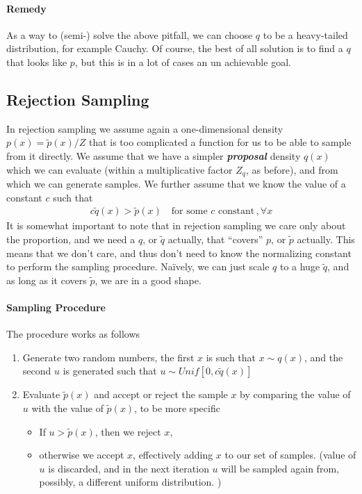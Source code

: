 \documentclass[11pt]{article}
\begin{document}
\paragraph{Remedy} As a way to (semi-) solve the above pitfall, we can choose $q$ to be a heavy-tailed distribution, for example Cauchy. Of course, the best of all solution is to find a $q$ that looks like $p$, but this is in a lot of cases an un achievable goal. 

\subsection{Rejection Sampling}
In rejection sampling we assume again a one-dimensional density $p(x) = \tilde p(x) /Z$ that is too complicated a function for us to be able to sample from it directly. We assume that we have a simpler \textit{\textbf{proposal}} density $q(x)$ which we can evaluate (within a multiplicative factor $Z_q$, as before), and from which we can generate samples. We further assume that we know the value of a constant $c$ such that
\begin{align}
    c \tilde q(x) > \tilde p(x) \quad \text{for some $c$ constant}\, , \forall x
\end{align}
It is somewhat important to note that in rejection sampling we care only about the proportion, and we need a $q$, or $\tilde q$ actually, that ``covers'' $p$, or $\tilde p$ actually. This means that we don't care, and thus don't need to know the normalizing constant to perform the sampling procedure. Na\"ively, we can just scale $q$ to a huge $\tilde q$, and as long as it covers $\tilde p$, we are in a good shape. 

\paragraph{Sampling Procedure} The procedure works as follows
\begin{enumerate}
    \item Generate two random numbers, the first $x$ is such that $x \sim q(x)$, and the second $u$ is generated such that $u \sim Unif[0, c\tilde q(x)]$
    \item Evaluate $\tilde p(x)$ and accept or reject the sample $x$ by comparing the value of $u$ with the value of $\tilde p(x)$, to be more specific
    \begin{itemize}
        \item If $u > \tilde p(x)$, then we reject $x$, 
        \item otherwise we accept $x$, effectively adding $x$ to our set of samples. (value of $u$ is discarded, and in the next iteration $u$ will be sampled again from, possibly, a different uniform distribution. )
    \end{itemize}
\end{enumerate}
\end{document}
